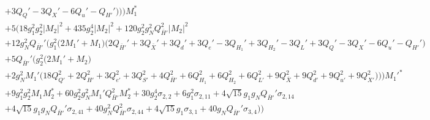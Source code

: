 {\begin{align}
&  + 3 Q_Q'  -3 Q_X'  -6 Q_u'  - Q_{H'}' \Big)\Big)\Big)M_1^* \nonumber \\ 
 &+5 \Big(18 g_{1}^{2} g_{2}^{2} |M_2|^2 +435 g_{2}^{4} |M_2|^2 +120 g_{2}^{2} g_{N}^{2} Q_{\bar{H}'}^{2} |M_2|^2 \nonumber \\ 
 &+12 g_{N}^{2} Q_{\bar{H}'}' \Big(g_{1}^{2} \Big(2 M_1'  + M_1\Big)\Big(2 Q_{\bar{H}'}'  + 3 Q_{\bar{X}}'  + 3 Q_d'  + 3 Q_e'  -3 Q_{H_1}'  + 3 Q_{H_2}'  -3 Q_L'  + 3 Q_Q'  -3 Q_X'  -6 Q_u'  - Q_{H'}' \Big)\nonumber \\ 
 &+5 Q_{\bar{H}'}' \Big(g_{2}^{2} \Big(2 M_1'  + M_2\Big)\nonumber \\ 
 &+2 g_{N}^{2} M_1' \Big(18 Q_{Q'}^{2}  + 2 Q_{H'}^{2}  + 3 Q_{e'}^{2}  + 3 Q_{S'}^{2}  + 4 Q_{\bar{H}'}^{2}  + 6 Q_{H_1}^{2}  + 6 Q_{H_2}^{2}  + 6 Q_{L'}^{2}  + 9 Q_{\bar{X}}^{2}  + 9 Q_{d'}^{2}  + 9 Q_{u'}^{2}  + 9 Q_{X'}^{2} \Big)\Big)\Big)M_1'^* \nonumber \\ 
 &+9 g_{1}^{2} g_{2}^{2} M_1 M_2^* +60 g_{2}^{2} g_{N}^{2} M_1' Q_{\bar{H}'}^{2} M_2^* +30 g_{2}^{4} \sigma_{2,2} +6 g_{1}^{2} \sigma_{2,11} +4 \sqrt{15} g_1 g_N Q_{\bar{H}'}' \sigma_{2,14} \nonumber \\ 
 &+4 \sqrt{15} g_1 g_N Q_{\bar{H}'}' \sigma_{2,41} +40 g_{N}^{2} Q_{\bar{H}'}^{2} \sigma_{2,44} +4 \sqrt{15} g_1 \sigma_{3,1} +40 g_N Q_{\bar{H}'}' \sigma_{3,4} \Big)\Big)
\end{align}} 

